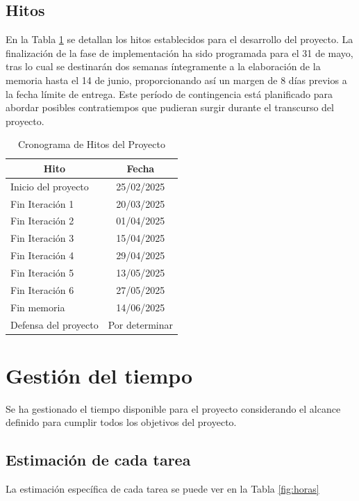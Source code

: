 \subsection{Hitos}\label{sec:hitos}

En la Tabla \ref{tab:hitos} se detallan los hitos establecidos para el desarrollo del proyecto. La finalización de la fase de implementación ha sido programada para el 31 de mayo, tras lo cual se destinarán dos semanas íntegramente a la elaboración de la memoria hasta el 14 de junio, proporcionando así un margen de 8 días previos a la fecha límite de entrega. Este período de contingencia está planificado para abordar posibles contratiempos que pudieran surgir durante el transcurso del proyecto.


\begin{table}[H]\centering
\begin{tabular}{|l|c|}
\hline
\multicolumn{1}{|c|}{\textbf{Hito}} & \multicolumn{1}{c|}{\textbf{Fecha}} \\
\hline
Inicio del proyecto & 25/02/2025 \\
\hline
Fin Iteración 1 & 20/03/2025 \\
\hline
Fin Iteración 2 & 01/04/2025 \\
\hline
Fin Iteración 3 & 15/04/2025 \\
\hline
Fin Iteración 4 & 29/04/2025 \\
\hline
Fin Iteración 5 & 13/05/2025 \\
\hline
Fin Iteración 6 & 27/05/2025 \\
\hline
Fin memoria & 14/06/2025 \\
\hline
Defensa del proyecto & Por determinar \\
\hline
\end{tabular}
\caption{Cronograma de Hitos del Proyecto}
\label{tab:hitos}
\end{table}

\section{Gestión del tiempo}
Se ha gestionado el tiempo disponible para el proyecto considerando el alcance definido para cumplir todos los objetivos del proyecto. 

\subsection{Estimación de cada tarea}
La estimación específica de cada tarea se puede ver en la Tabla \ref{fig:horas}

